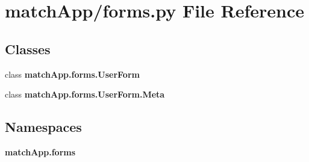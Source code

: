 \section{match\+App/forms.py File Reference}
\label{forms_8py}
\subsection*{Classes}
\begin{DoxyCompactItemize}
\item 
class {\bf match\+App.\+forms.\+User\+Form}
\item 
class {\bf match\+App.\+forms.\+User\+Form.\+Meta}
\end{DoxyCompactItemize}
\subsection*{Namespaces}
\begin{DoxyCompactItemize}
\item 
 {\bf match\+App.\+forms}
\end{DoxyCompactItemize}
